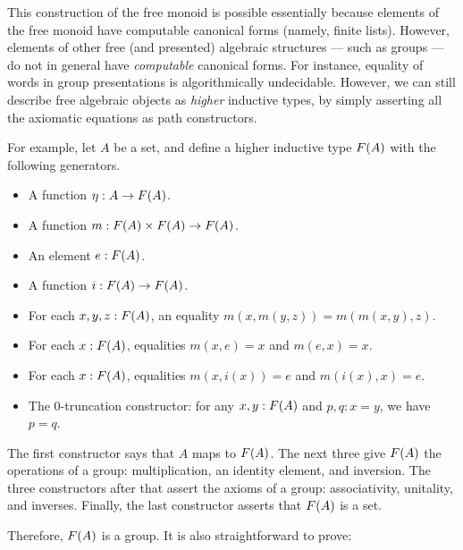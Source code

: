 %

This construction of the free monoid is possible essentially because elements of the free monoid have computable canonical forms (namely, finite lists).
However, elements of other free (and presented) algebraic structures --- such as groups --- do not in general have \emph{computable} canonical forms.
For instance, equality of words in group presentations is algorithmically undecidable.
However, we can still describe free algebraic objects as \emph{higher} inductive types, by simply asserting all the axiomatic equations as path constructors.

%
%
For example, let $A$ be a set, and define a higher inductive type $F(A)$ with the following generators.
\begin{itemize}
\item A function $\eta:A\to F(A)$.
\item A function $m: F(A) \times F(A) \to F(A)$.
\item An element $e:F(A)$.
\item A function $i:F(A) \to F(A)$.
\item For each $x,y,z:F(A)$, an equality $m(x,m(y,z)) = m(m(x,y),z)$.
\item For each $x:F(A)$, equalities $m(x,e) = x$ and $m(e,x) = x$.
\item For each $x:F(A)$, equalities $m(x,i(x)) = e$ and $m(i(x),x) = e$.
\item The $0$-truncation constructor: for any $x,y:F(A)$ and $p,q:x=y$, we have $p=q$.
\end{itemize}
The first constructor says that $A$ maps to $F(A)$.
The next three give $F(A)$ the operations of a group: multiplication, an identity element, and inversion.
The three constructors after that assert the axioms of a group: associativity, unitality, and inverses.
Finally, the last constructor asserts that $F(A)$ is a set.

Therefore, $F(A)$ is a group.
It is also straightforward to prove:

